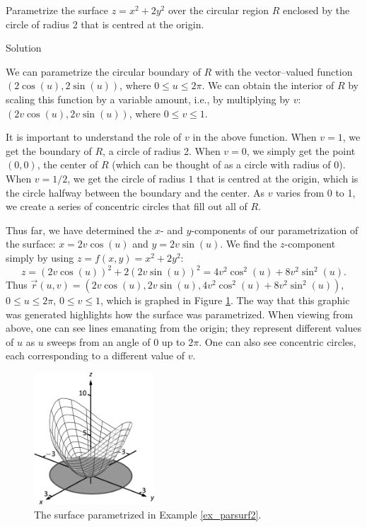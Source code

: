 \begin{example}
\label{ex_parsurf2}
Parametrize the surface $z=x^2+2y^2$ over the circular region $R$ enclosed by the circle of radius 2 that is centred at the origin.

Solution 


We can parametrize the circular boundary of $R$ with the vector--valued function $\left( 2\cos (u),2\sin (u)\right)$, where $0\leq u\leq 2\pi$. We can obtain the interior of $R$ by scaling this function by a variable amount, i.e., by multiplying by $v$: $\left( 2v\cos (u),2v\sin (u)\right)$, where $0\leq v\leq 1$. 

It is important to understand the role of $v$ in the above function. When $v=1$, we get the boundary of $R$, a circle of radius 2. When $v=0$, we simply get the point $(0,0)$, the center of $R$ (which can be thought of as a circle with radius of 0). When $v=1/2$, we get the circle of radius $1$ that is centred at the origin, which is the circle halfway between the boundary and the center. As $v$ varies from 0 to 1, we create a series of concentric circles that fill out all of $R$.


Thus far, we have determined the $x$- and $y$-components of our parametrization of the surface: $x=2v\cos (u)$ and $y=2v\sin (u)$. We find the $z$-component simply by using $z = f(x,y) = x^2+2y^2$: 
$$z = (2v\cos (u))^2+2(2v\sin (u))^2 = 4v^2\cos^2(u)+8v^2\sin^2(u).$$
Thus $\vec r(u,v) = \left( 2v\cos (u),2v\sin (u),4v^2\cos^2(u)+8v^2\sin^2(u)\right)$, $0\leq u\leq 2\pi$, $0\leq v\leq 1$, which is graphed in Figure \ref{fig_Vector_Calc_21}. The way that this graphic was generated highlights how the surface was parametrized. When viewing from above, one can see lines emanating from the origin; they represent different values of $u$ as $u$ sweeps from an angle of 0 up to $2\pi$. One can also see concentric circles, each corresponding to a different value of $v$. 



\begin{figure}[H]
	\begin{center}
			\includegraphics[width=0.4\textwidth]{fig_Vector_Calc_21}
	\caption{The surface parametrized in Example \ref{ex_parsurf2}.}
	\label{fig_Vector_Calc_21}
	\end{center}
\end{figure}


\end{example}


